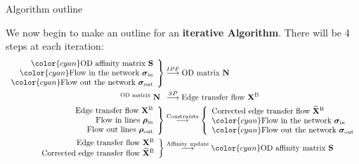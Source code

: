 \documentclass[10pt]{beamer}
\newcommand{\imp}[1]{\textbf{\color{cyan}#1}}
\begin{document}
	
	\begin{frame}{Algorithm outline}
		
		We now begin to make an outline for an \imp{iterative Algorithm}. There will be 4 steps at each iteration: \\
		\footnotesize
		\begin{align}
			\left. \begin{array}{r} 
				{\color{cyan} \text{OD affinity matrix } \mathbf{S}} \\
				{\color{cyan} \text{Flow in the network } \bm{\sigma}_\text{in}} \\
				{\color{cyan} \text{Flow out the network } \bm{\sigma}_\text{out}}
			\end{array} \right\}  &\overset{IPF}{\longrightarrow} \text{OD matrix } \mathbf{N} \\
			\begin{array}{r} ^
			\text{OD matrix } \mathbf{N}
			\end{array} &\overset{SP}{\longrightarrow} \text{Edge transfer flow } \mathbf{X}^\text{B} \\
			\left. \begin{array}{r} 
			\text{Edge transfer flow } \mathbf{X}^\text{B} \\
			\text{Flow in lines } \bm{\rho}_\text{in} \\
			\text{Flow out lines } \bm{\rho}_\text{out}
			\end{array} \right\}  &\overset{\text{Constraints}}{\longrightarrow} 
			\left\{ \begin{array}{l}
			\text{Corrected edge transfer flow } \widetilde{\mathbf{X}}^\text{B} \\
			{\color{cyan} \text{Flow in the network } \bm{\sigma}_\text{in}} \\
			{\color{cyan} \text{Flow out the network } \bm{\sigma}_\text{out}}
			\end{array} \right. \\
			\left. \begin{array}{r} 
			\text{Edge transfer flow } \mathbf{X}^\text{B} \\
			 \text{Corrected edge transfer flow } \widetilde{\mathbf{X}}^\text{B}
			\end{array} \right\}  &\overset{\text{Affinity update}}{\longrightarrow} {\color{cyan} \text{OD affinity matrix } \mathbf{S}}
		\end{align}	
	\end{frame}
	
\end{document}
